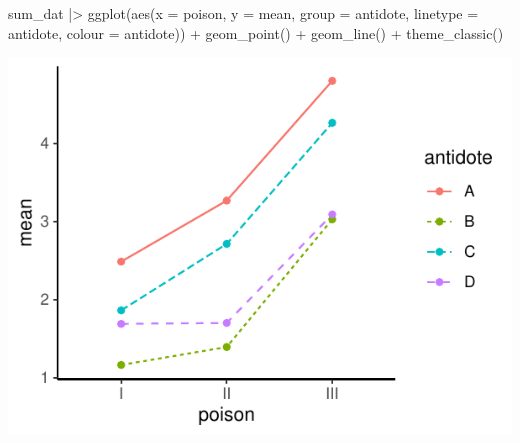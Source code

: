 \documentclass[a4paper]{article}\usepackage[]{graphicx}\usepackage[]{xcolor}
\makeatletter
\def\maxwidth{ %
  \ifdim\Gin@nat@width>\linewidth
    \linewidth
  \else
    \Gin@nat@width
  \fi
}
\makeatother
\begin{document}
\hspace{0.02\textwidth}
\begin{minipage}[t]{0.49\textwidth}
\begin{Schunk}
\begin{Sinput}
sum_dat |>
  ggplot(aes(x = poison, y = mean,
             group = antidote, 
             linetype = antidote,
             colour = antidote)) + 
  geom_point() +
  geom_line() + 
  theme_classic()
\end{Sinput}


{\centering \includegraphics[width=\maxwidth]{figure/listings-unnamed-chunk-317-1} 

}

\end{Schunk}
\end{minipage}
\end{document}
